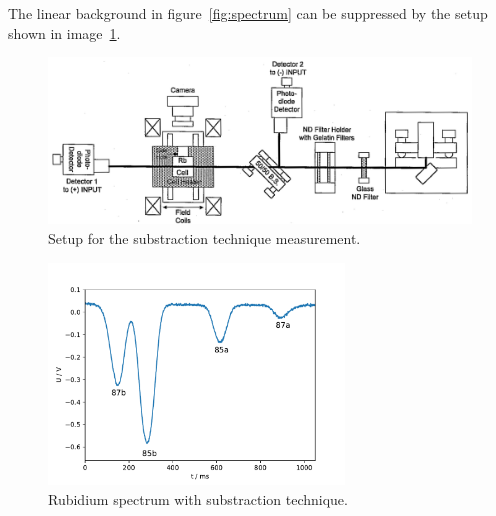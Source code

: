 The linear background in figure~\ref{fig:spectrum} can be suppressed by the
setup shown in image~\ref{fig:setup_substraction}.

\begin{figure}
  \centering
  \includegraphics[width=\textwidth]{Pics/setup_substraction.png}
  \caption{Setup for the substraction technique measurement.\cite{anleitung}}
  \label{fig:setup_substraction}
\end{figure}


\begin{figure}
  \centering
  \includegraphics[width=0.7\textwidth]{Pics/Rb_spectrum_subst.pdf}
  \caption{Rubidium spectrum with substraction technique.}
  \label{fig:spectrum_sub}
\end{figure}
